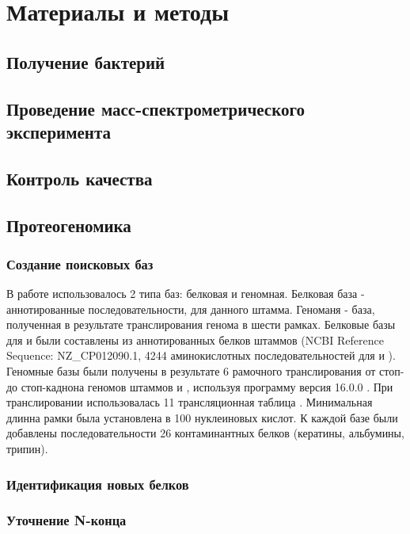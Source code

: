 \section{Материалы и методы}

\subsection{Получение бактерий}

\subsection{Проведение масс-спектрометрического эксперимента}

\subsection{Контроль качества}


\subsection{Протеогеномика}
\subsubsection{Создание поисковых баз}
В работе использовалось 2 типа баз: белковая и геномная. Белковая база - аннотированные последовательности, для данного штамма. Геноманя - база, полученная в результате транслирования генома в шести рамках.
Белковые базы для  и  были составлены из аннотированных белков штаммов (NCBI Reference Sequence: NZ\_CP012090.1, 4244 аминокислотных последовательностей для  и ).
Геномные базы были получены в результате 6 рамочного транслирования от стоп- до стоп-каднона геномов штаммов  и , используя программу  версия 16.0.0 \cite{rutherford2000artemis}. При транслировании использовалась 11 трансляционная таблица . Минимальная длинна рамки была установлена в 100 нуклеиновых кислот.
К каждой базе были добавлены последовательности 26 контаминантных белков (кератины, альбумины, трипин).

\subsubsection{Идентификация новых белков}

\subsubsection{Уточнение N-конца}

